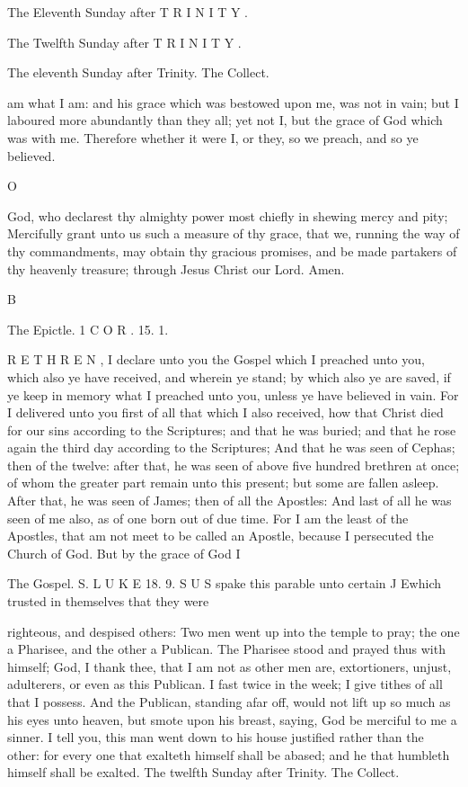 The Eleventh Sunday after T R I N I T Y .

The Twelfth Sunday after T R I N I T Y .

The eleventh Sunday after Trinity. The Collect.

am what I am: and his grace which was bestowed upon me, was not in vain; but I laboured more abundantly than they all; yet not I, but the grace of God which was with me. Therefore whether it were I, or they, so we preach, and so ye believed.

O

God, who declarest thy almighty power most chiefly in shewing mercy and pity; Mercifully grant unto us such a measure of thy grace, that we, running the way of thy commandments, may obtain thy gracious promises, and be made partakers of thy heavenly treasure; through Jesus Christ our Lord. Amen.

B

The Epictle. 1 C O R . 15. 1.

R E T H R E N , I declare unto you the Gospel which I preached unto you, which also ye have received, and wherein ye stand; by which also ye are saved, if ye keep in memory what I preached unto you, unless ye have believed in vain. For I delivered unto you first of all that which I also received, how that Christ died for our sins according to the Scriptures; and that he was buried; and that he rose again the third day according to the Scriptures; And that he was seen of Cephas; then of the twelve: after that, he was seen of above five hundred brethren at once; of whom the greater part remain unto this present; but some are fallen asleep. After that, he was seen of James; then of all the Apostles: And last of all he was seen of me also, as of one born out of due time. For I am the least of the Apostles, that am not meet to be called an Apostle, because I persecuted the Church of God. But by the grace of God I

The Gospel. S. L U K E 18. 9. S U S spake this parable unto certain J Ewhich trusted in themselves that they were

righteous, and despised others: Two men went up into the temple to pray; the one a Pharisee, and the other a Publican. The Pharisee stood and prayed thus with himself; God, I thank thee, that I am not as other men are, extortioners, unjust, adulterers, or even as this Publican. I fast twice in the week; I give tithes of all that I possess. And the Publican, standing afar off, would not lift up so much as his eyes unto heaven, but smote upon his breast, saying, God be merciful to me a sinner. I tell you, this man went down to his house justified rather than the other: for every one that exalteth himself shall be abased; and he that humbleth himself shall be exalted. The twelfth Sunday after Trinity. The Collect.


